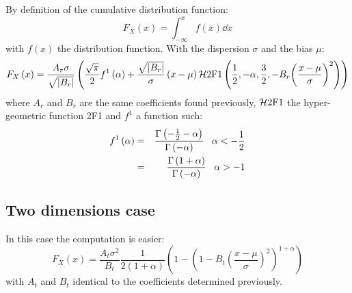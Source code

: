 By definition of the cumulative distribution function:
%
\begin{equation}
    F_X\left(x\right)=\int_{-\infty}^x f\left(x\right)\dd x
\end{equation}
%
with $f\left(x\right)$ the distribution function. With the dispersion
$\sigma$ and the bias $\mu$:
%
\begin{equation}
    F_X\left(x\right)=
    \frac{A_r\sigma}{\sqrt{\left|B_r\right|}}
    \left(
        \frac{\sqrt\pi}{2} f^1\left(\alpha\right)+
        \frac{\sqrt{\left|B_r\right|}}{\sigma}\left(x-\mu\right)
        {\mathcal{H}2{\rm{F}}1\left(\frac{1}{2},-\alpha,\frac{3}{2},-B_r{\left(\frac{x-\mu}{\sigma}\right)}^2\right)}\right)
\end{equation}
%
where $A_r$ and $B_r$ are the same coefficients found previously,
$\mathcal{H}{2{\rm{F}}1}$ the hyper-geometric function 2F1 and $f^1$ a
function such:
%
\begin{eqnarray}
    f^1\left(\alpha\right)&=&
        \frac{\Gamma\left(-\frac{1}{2}-\alpha\right)}{\Gamma\left(-\alpha\right)}
        \;\;\;\alpha<-\frac{1}{2}\\\nonumber
    &=&\frac{\Gamma\left(1+\alpha\right)}{\Gamma\left(-\alpha\right)}
        \;\;\;\alpha>-1\\
\end{eqnarray}

\subsection{Two dimensions case}
\label{sub:cdf_two_dimensions_case}

In this case the computation is easier:
%
\begin{equation}
    F_X\left(x\right)=
        \frac{A_t\sigma^2}{B_t}
        \frac{1}{2\left(1+\alpha\right)}
            \left(1-{\left(
                1-B_t{\left(\frac{x-\mu}{\sigma}\right)}^2
            \right)}^{1+\alpha}\right)
\end{equation}
%
with $A_t$ and $B_t$ identical to the coefficients determined previously.
